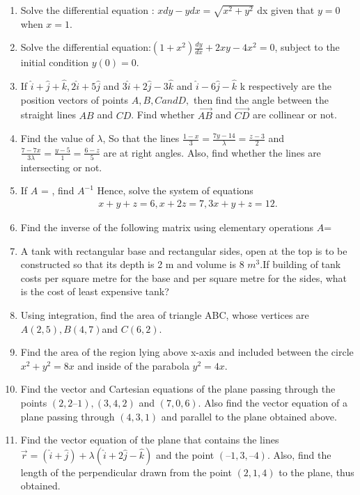 \documentclass{article}
\begin{document}
\begin{enumerate}
\item Solve the differential equation : $x dy-y dx = \sqrt{x^2+y^2}$ dx given that $y=0$ when $x=1$.
\item Solve the differential equation:$(1+x^2)\frac{dy}{dx}+2xy-4x^2=0$, subject to the initial condition $y(0)=0$.
\item If  $\hat{i}+\hat{j}+\hat{k}, 2\hat{i}+5\hat{j}$ and $3\hat{i}+2\hat{j}-3\hat{k}$ and $\hat{i}-6\hat{j}-\hat{k}$ k respectively are the position vectors of points $A, B, C and D,$ then find the angle between the straight lines $AB$ and $CD$. Find whether $\vec{AB}$ and $\Vec{CD}$ are collinear or not. 
\item Find the value of $\lambda$, So that the lines $\frac{1-x}{3} = \frac{7y-14}{\lambda}=\frac{z-3}{2}$ and $\frac{7-7x}{3\lambda}=\frac{y-5}{1}=\frac{6-z}{5}$ are at right angles. Also, find whether the lines are intersecting or not. 
\item If $A$ =
 , find $A^{-1}$  Hence, solve the system of equations
    \begin{align*}
    x + y + z = 6, x + 2z = 7, 3x + y + z = 12.
    \end{align*}
\item Find the inverse of the following matrix using elementary operations
$A$=
\item A tank with rectangular base and rectangular sides, open at the top is to be constructed so that its depth is 2 m and volume is 8 $m^3$.If building of tank costs  per square metre for the base and  per square metre for the sides, what is the cost of least expensive tank? 
\item Using integration, find the area of triangle ABC, whose vertices are $A(2, 5), B(4, 7) $and $C(6, 2)$.
\item Find the area of the region lying above x-axis and included between the circle $x^2 + y^2 = 8x$  and inside of the parabola $y^2 = 4x$.
\item Find the vector and Cartesian equations of the plane passing through the points 
$(2, 2 –1), (3, 4, 2)$ and $(7, 0, 6)$. Also find the vector equation of a plane passing 
through $(4, 3, 1)$ and parallel to the plane obtained above.
\item Find the vector equation of the plane that contains the lines $\Vec{r}=(\hat{i}+\hat{j})+\lambda(\hat{i}+2\hat{j}-\hat{k})$ and the point $(–1, 3, – 4)$. Also, find the length of the perpendicular drawn from the point $(2, 1, 4)$ to the plane, thus obtained.

\end{enumerate}
\end{document}
